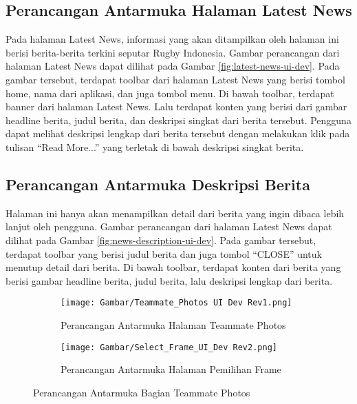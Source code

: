 \subsection{Perancangan Antarmuka Halaman Latest News}

Pada halaman Latest News, informasi yang akan ditampilkan oleh halaman ini berisi berita-berita terkini seputar Rugby Indonesia. Gambar perancangan dari halaman Latest News dapat dilihat pada Gambar \ref{fig:latest-news-ui-dev}. Pada gambar tersebut, terdapat toolbar dari halaman Latest News yang berisi tombol home, nama dari aplikasi, dan juga tombol menu. Di bawah toolbar, terdapat banner dari halaman Latest News. Lalu terdapat konten yang berisi dari gambar headline berita, judul berita, dan deskripsi singkat dari berita tersebut. Pengguna dapat melihat deskripsi lengkap dari berita tersebut dengan melakukan klik pada tulisan ``Read More...'' yang terletak di bawah deskripsi singkat berita.

\subsection{Perancangan Antarmuka Deskripsi Berita}

Halaman ini hanya akan menampilkan detail dari berita yang ingin dibaca lebih lanjut oleh pengguna. Gambar perancangan dari halaman Latest News dapat dilihat pada Gambar \ref{fig:news-description-ui-dev}. Pada gambar tersebut, terdapat toolbar yang berisi judul berita dan juga tombol ``CLOSE'' untuk menutup detail dari berita. Di bawah toolbar, terdapat konten dari berita yang berisi gambar headline berita, judul berita, lalu deskripsi lengkap dari berita.

\begin{figure}[H]
     \centering
     \begin{subfigure}[b]{0.3\textwidth}
        \centering
        \texttt{[image: Gambar/Teammate\_Photos UI Dev Rev1.png]}
        \caption{Perancangan Antarmuka Halaman Teammate Photos}
        \label{fig:teammate-photos-ui-dev}
     \end{subfigure}
     \hspace*{0.5in}
     \begin{subfigure}[b]{0.3\textwidth}
        \centering
        \texttt{[image: Gambar/Select\_Frame\_UI\_Dev Rev2.png]}
        \caption{Perancangan Antarmuka Halaman Pemilihan Frame}
        \label{fig:select-frame-ui-dev}
     \end{subfigure}
        \caption{Perancangan Antarmuka Bagian Teammate Photos}
        \label{fig:teammate-photos-page-full-design}
\end{figure}

